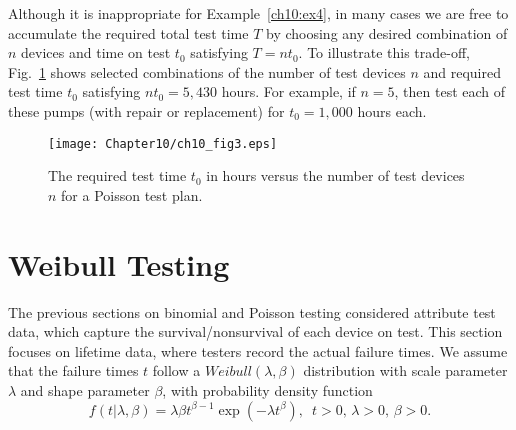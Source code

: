 \documentclass {book}
\begin{document}
Although it is inappropriate for Example~\ref{ch10:ex4}, in many
cases we are free to accumulate the required total test time $T$
by choosing any desired combination of $n$ devices and time on
test $t_{0}$ satisfying $T=nt_{0}$. To illustrate this trade-off,
Fig.~\ref{ch10:fig3} shows selected combinations of the number of
test devices $n$ and required test time $t_{0}$ satisfying $nt_{0}
= 5,430$ hours. For example, if $n = 5$, then test each of these
pumps (with repair or replacement) for $t_{0} = 1,000$ hours each.

\begin{figure}
\centering
\texttt{[image: Chapter10/ch10\_fig3.eps]}
\caption{The required test time
$t_{0}$ in hours versus the number of test devices $n$ for a Poisson test plan.}\label{ch10:fig3}
\end{figure}

\section{Weibull Testing}\label{ch10:sec4} The previous sections on
binomial and Poisson testing considered attribute
test data, which capture the survival/nonsurvival of each device
on test. This section focuses on lifetime data, where testers
record the actual failure times. We assume that the failure times
$t$ follow a $Weibull(\lambda, \beta)$ distribution with scale
parameter $\lambda$ and shape parameter $\beta$, with probability
density function
\begin{equation}\label{ch10:eqn19}
f(t|\lambda,\beta)=\lambda\beta t^{\beta-1}\exp(-\lambda
t^{\beta}), \, \, \, t > 0, \, \lambda > 0, \, \beta>0.
\end{equation}
\end{document}
